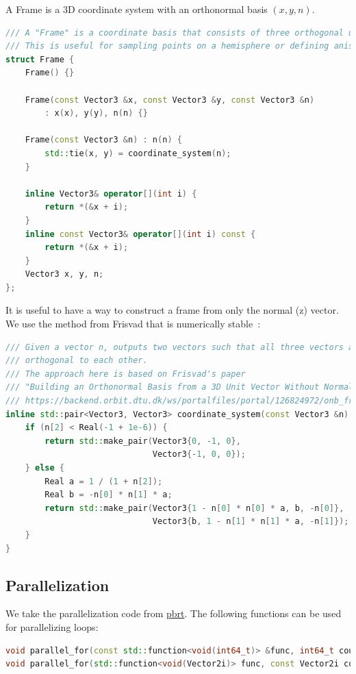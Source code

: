 A Frame is a 3D coordinate system with an orthonormal basis $(x, y, n)$.
\begin{lstlisting}[language=c++]
/// A "Frame" is a coordinate basis that consists of three orthogonal unit vectors.
/// This is useful for sampling points on a hemisphere or defining anisotropic BSDFs.
struct Frame {
    Frame() {}

    Frame(const Vector3 &x, const Vector3 &y, const Vector3 &n)
        : x(x), y(y), n(n) {}

    Frame(const Vector3 &n) : n(n) {
        std::tie(x, y) = coordinate_system(n);
    }

    inline Vector3& operator[](int i) {
        return *(&x + i);
    }
    inline const Vector3& operator[](int i) const {
        return *(&x + i);
    }
    Vector3 x, y, n;
};
\end{lstlisting}

It is useful to have a way to construct a frame from only the normal (z) vector. We use the method
from Frisvad that is numerically stable~\cite{Frisvad:2012:BOB}:
\begin{lstlisting}[language=c++]
/// Given a vector n, outputs two vectors such that all three vectors are
/// orthogonal to each other.
/// The approach here is based on Frisvad's paper
/// "Building an Orthonormal Basis from a 3D Unit Vector Without Normalization"
/// https://backend.orbit.dtu.dk/ws/portalfiles/portal/126824972/onb_frisvad_jgt2012_v2.pdf
inline std::pair<Vector3, Vector3> coordinate_system(const Vector3 &n) {
    if (n[2] < Real(-1 + 1e-6)) {
        return std::make_pair(Vector3{0, -1, 0},
                              Vector3{-1, 0, 0});
    } else {
        Real a = 1 / (1 + n[2]);
        Real b = -n[0] * n[1] * a;
        return std::make_pair(Vector3{1 - n[0] * n[0] * a, b, -n[0]},
                              Vector3{b, 1 - n[1] * n[1] * a, -n[1]});
    }
}
\end{lstlisting}

\subsection{Parallelization}
We take the parallelization code from \href{https://github.com/mmp/pbrt-v3/blob/master/src/core/parallel.h}{pbrt}. The following functions can be used for parallelizing loops:
\begin{lstlisting}[language=c++]
void parallel_for(const std::function<void(int64_t)> &func, int64_t count, int64_t chunkSize = 1);
void parallel_for(std::function<void(Vector2i)> func, const Vector2i count);
\end{lstlisting}

